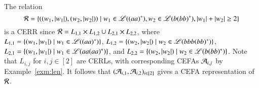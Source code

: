 \begin{example}\label{exm:CERR}
The relation 
\[\mathcal{R}=\left\{((w_1, |w_1|), (w_2, |w_2|)) \mid  w_1 \in \mathscr{L}((aa)^*), w_2 \in \mathscr{L}(b(bb)^*), |w_1|+|w_2| \ge 2\right\}\] 
is a CERR since 
$\mathcal{R} = L_{1,1} \times L_{1,2} \cup L_{2,1} \times L_{2,2}$, where $L_{1,1}=\{(w_1, |w_1|) \mid w_1 \in \mathscr{L}((aa)^*)\}$, $L_{1,2}=\{(w_2, |w_2|) \mid  w_2 \in \mathscr{L}(bbb(bb)^*)\}$, $L_{2,1}=\{(w_1, |w_1|) \mid w_1 \in \mathscr{L}(aa(aa)^*)\}$, and $L_{2,2}=\{(w_2, |w_2|) \mid  w_2 \in \mathscr{L}(b(bb)^*)\}$.
Note that $L_{i,j}$ for $i,j\in[2]$ are CERLs, with corresponding CEFAs $\mathcal{A}_{i,j}$ by  Example~\ref{exm:len}. It follows that %
$(\mathcal{A}_{i,1}, \mathcal{A}_{i,2})_{i \in [2]}$ gives a CEFA representation of $\mathcal{R}$. %
\end{example}

